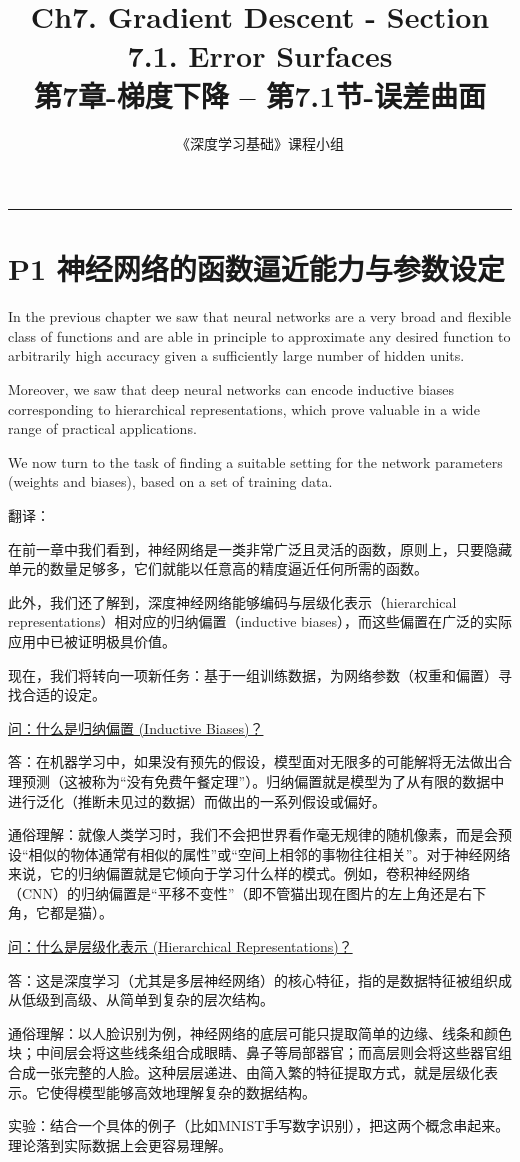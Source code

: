 \documentclass{article}
\title{Ch7. Gradient Descent - Section 7.1. Error Surfaces\\
第7章-梯度下降 -- 第7.1节-误差曲面 }
\author{《深度学习基础》课程小组}
\begin{document}
\maketitle
\tableofcontents

\setlength{\parindent}{0pt} %
\setlength{\parskip}{1.5em} %

\noindent\rule{\linewidth}{0.4pt}

\section{P1 神经网络的函数逼近能力与参数设定}

In the previous chapter we saw that neural networks are a very broad and flexible class of functions and are able in principle to approximate any desired function to arbitrarily high accuracy given a sufficiently large number of hidden units. 

Moreover, we saw that deep neural networks can encode inductive biases corresponding to hierarchical representations, which prove valuable in a wide range of practical applications. 

We now turn to the task of finding a suitable setting for the network parameters (weights and biases), based on a set of training data.

{\color{red}
翻译：

在前一章中我们看到，神经网络是一类非常广泛且灵活的函数，原则上，只要隐藏单元的数量足够多，它们就能以任意高的精度逼近任何所需的函数。

此外，我们还了解到，深度神经网络能够编码与层级化表示（hierarchical representations）相对应的归纳偏置（inductive biases），而这些偏置在广泛的实际应用中已被证明极具价值。

现在，我们将转向一项新任务：基于一组训练数据，为网络参数（权重和偏置）寻找合适的设定。
}

{\color{blue}
\underline{问：什么是归纳偏置 (Inductive Biases)？}

答：在机器学习中，如果没有预先的假设，模型面对无限多的可能解将无法做出合理预测（这被称为“没有免费午餐定理”）。归纳偏置就是模型为了从有限的数据中进行泛化（推断未见过的数据）而做出的一系列假设或偏好。

通俗理解：就像人类学习时，我们不会把世界看作毫无规律的随机像素，而是会预设“相似的物体通常有相似的属性”或“空间上相邻的事物往往相关”。对于神经网络来说，它的归纳偏置就是它倾向于学习什么样的模式。例如，卷积神经网络（CNN）的归纳偏置是“平移不变性”（即不管猫出现在图片的左上角还是右下角，它都是猫）。

\underline{问：什么是层级化表示 (Hierarchical Representations)？}

答：这是深度学习（尤其是多层神经网络）的核心特征，指的是数据特征被组织成从低级到高级、从简单到复杂的层次结构。

通俗理解：以人脸识别为例，神经网络的底层可能只提取简单的边缘、线条和颜色块；中间层会将这些线条组合成眼睛、鼻子等局部器官；而高层则会将这些器官组合成一张完整的人脸。这种层层递进、由简入繁的特征提取方式，就是层级化表示。它使得模型能够高效地理解复杂的数据结构。

实验：结合一个具体的例子（比如MNIST手写数字识别），把这两个概念串起来。理论落到实际数据上会更容易理解。
}
\end{document}
